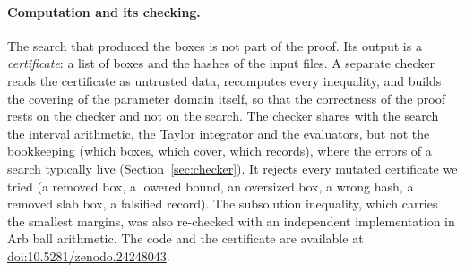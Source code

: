 \documentclass[11pt]{article}
\theoremstyle{definition}
\begin{document}
\paragraph{Computation and its checking.} The search that produced the boxes is not part of the proof. Its output is a
\emph{certificate}: a list of boxes and the hashes of the input files. A separate checker reads the certificate as
untrusted data, recomputes every inequality, and builds the covering of the parameter domain itself, so that the
correctness of the proof rests on the checker and not on the search. The checker shares with the search the interval
arithmetic, the Taylor integrator and the evaluators, but not the bookkeeping (which boxes, which cover, which records),
where the errors of a search typically live (Section~\ref{sec:checker}). It rejects every
mutated certificate we tried (a removed box, a lowered bound, an oversized box, a wrong hash, a removed slab box, a
falsified record). The subsolution inequality, which carries the smallest margins, was also re-checked with an
independent implementation in Arb ball arithmetic. The code and the certificate are available at
\href{https://doi.org/10.5281/zenodo.24248043}{doi:10.5281/zenodo.24248043}.
\end{document}
